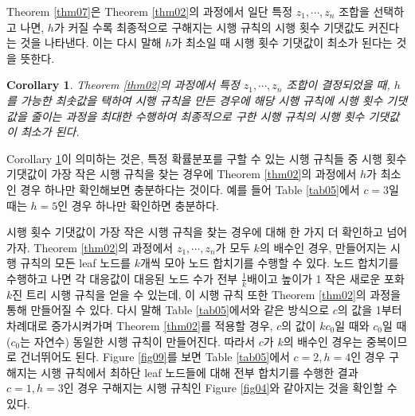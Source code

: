 \documentclass[11pt]{article}
\newtheorem{corollary}{Corollary}[theorem]
\begin{document}
Theorem \ref{thm07}은 Theorem \ref{thm02}의 과정에서 일단 특정 $z_{1}, \cdots, z_{n}$ 조합을 선택하고 나면, $h$가 커질 수록 최종적으로 구해지는 시행 규칙의 시행 횟수 기댓값도 커진다는 것을 나타낸다. 이는 다시 말해 $h$가 최소일 때 시행 횟수 기댓값이 최소가 된다는 것을 뜻한다.

\singlespacing
\begin{corollary}
Theorem \ref{thm02}의 과정에서 특정 $z_{1}, \cdots, z_{n}$ 조합이 결정되었을 때, $h$를 가능한 최솟값을 택하여 시행 규칙을 만든 경우에 해당 시행 규칙에 시행 횟수 기댓값을 줄이는 과정을 최대한 수행하여 최종적으로 구한 시행 규칙의 시행 횟수 기댓값이 최소가 된다.
\label{cor0701}
\end{corollary}
\doublespacing

Corollary \ref{cor0701}이 의미하는 것은, 특정 확률분포를 구할 수 있는 시행 규칙들 중 시행 횟수 기댓값이 가장 작은 시행 규칙을 찾는 경우에 Theorem \ref{thm02}의 과정에서 $h$가 최소인 경우 하나만 확인해보면 충분하다는 것이다. 예를 들어 Table \ref{tab05}에서 $c=3$일 때는 $h=5$인 경우 하나만 확인하면 충분하다.

시행 횟수 기댓값이 가장 작은 시행 규칙을 찾는 경우에 대해 한 가지 더 확인하고 넘어가자. Theorem \ref{thm02}의 과정에서 $z_{1}, \cdots, z_{n}$가 모두 $k$의 배수인 경우, 만들어지는 시행 규칙의 모든 leaf 노드를 $k$개씩 모아 노드 합치기를 수행할 수 있다. 노드 합치기를 수행하고 나면 각 대응값이 대응된 노드 수가 전부 $\displaystyle \frac{1}{k}$배이고 높이가 1 작은 새로운 포화 $k$진 트리 시행 규칙을 얻을 수 있는데, 이 시행 규칙 또한 Theorem \ref{thm02}의 과정을 통해 만들어질 수 있다. 다시 말해 Table \ref{tab05}에서와 같은 방식으로 $c$의 값을 1부터 차례대로 증가시켜가며 Theorem \ref{thm02}를 적용할 경우, $c$의 값이 $kc_{0}$일 때와 $c_{0}$일 때 ($c_{0}$는 자연수) 동일한 시행 규칙이 만들어진다. 따라서 $c$가 $k$의 배수인 경우는 중복이므로 건너뛰어도 된다. Figure \ref{fig09}를 보면 Table \ref{tab05}에서 $c=2, h=4$인 경우 구해지는 시행 규칙에서 최하단 leaf 노드들에 대해 전부 합치기를 수행한 결과 $c=1, h=3$인 경우 구해지는 시행 규칙인 Figure \ref{fig04}와 같아지는 것을 확인할 수 있다.\\
\end{document}
